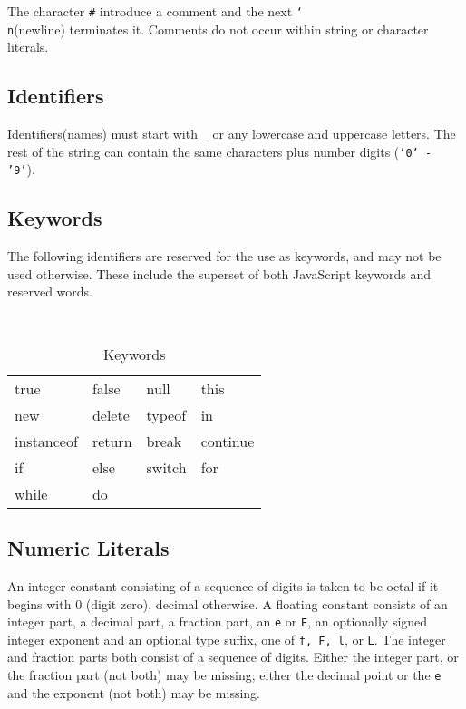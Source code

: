 \documentclass[10pt]{report}
\begin{document}
The character \texttt{\#} introduce a comment and the next \texttt{\char`\\ n}(newline) terminates it. Comments do not occur within string or character literals.

\subsection{Identifiers}
\label{sec:identifiers}

Identifiers(names) must start with \texttt{\_} or any lowercase and uppercase letters. The rest of the string can contain the same characters plus number digits (\texttt{'0' - '9'}).

\subsection{Keywords}
\label{sec:keywords}

The following identifiers are reserved for the use as keywords, and may not be used otherwise. These include the superset of both JavaScript keywords and reserved words. 

\begin{table}[ch]
  \centering
  {\tt
  \begin{tabular}{l l l l}
    true       & false   & null    & this \\
    new        & delete  & typeof  & in  \\
    instanceof & return  & break   & continue \\
    if         & else    & switch  & for \\
    while   & do \\

  \end{tabular}
  }
  \caption{Keywords}
\end{table}
\subsection{Numeric Literals}
\label{sec:numeric_lit}

An integer constant consisting of a sequence of digits is taken to be octal if it begins with 0 (digit zero), decimal otherwise. A floating constant consists of an integer part, a decimal part, a fraction part, an \texttt{e} or \texttt{E}, an optionally signed integer exponent and an optional type suffix, one of \texttt{f, F, l}, or \texttt{L}. The integer and fraction parts both consist of a sequence of digits. Either the integer part, or the fraction part (not both) may be missing; either the decimal point or the \texttt{e} and the exponent (not both) may be missing.
\end{document}
